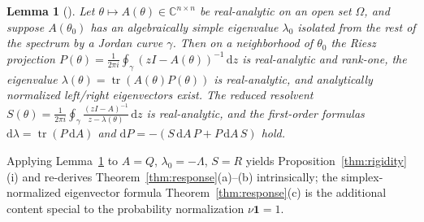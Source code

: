 \documentclass[11pt,reqno]{amsart}
\theoremstyle{plain}
\newtheorem{lemma}[theorem]{Lemma}
\theoremstyle{definition}
\theoremstyle{remark}
\newcommand{\C}{\mathbb{C}}
\newcommand{\one}{\mathbf{1}}
\newcommand{\dd}{\mathrm{d}}
\DeclareMathOperator{\tr}{tr}
\begin{document}
\begin{lemma}[{\cite[Ch.~II \S1.8, Ch.~VII \S1.3]{Kato1995}}]\label{lem:kato}
Let $\theta\mapsto A(\theta)\in\C^{n\times n}$ be real-analytic on an open set
$\Omega$, and suppose $A(\theta_0)$ has an algebraically simple eigenvalue
$\lambda_0$ isolated from the rest of the spectrum by a Jordan curve $\gamma$. Then
on a neighborhood of $\theta_0$ the Riesz projection
$P(\theta)=\frac{1}{2\pi i}\oint_{\gamma}(zI-A(\theta))^{-1}\,\dd z$ is real-analytic
and rank-one, the eigenvalue $\lambda(\theta)=\tr(A(\theta)P(\theta))$ is
real-analytic, and analytically normalized left/right eigenvectors exist. The
reduced resolvent $S(\theta)=\frac{1}{2\pi i}\oint_{\gamma}\frac{(zI-A)^{-1}}
{z-\lambda(\theta)}\,\dd z$ is real-analytic, and the first-order formulas
$\dd\lambda=\tr(P\,\dd A)$ and $\dd P=-(S\,\dd A\,P+P\,\dd A\,S)$ hold.
\end{lemma}

Applying Lemma~\ref{lem:kato} to $A=Q$, $\lambda_0=-\Lambda$, $S=R$ yields
Proposition~\ref{thm:rigidity}(i) and re-derives Theorem~\ref{thm:response}(a)--(b)
intrinsically; the simplex-normalized eigenvector formula
Theorem~\ref{thm:response}(c) is the additional content special to the
probability normalization $\nu\one=1$.
\end{document}
